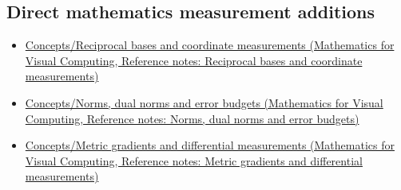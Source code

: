 \subsection{Direct mathematics measurement additions}\label{appendix-a6d556a4ef50-direct-mathematics-measurement-additions}

\hypertarget{appendix-a6d556a4ef50-direct-mathematics-measurement-additions}{}

\begin{itemize}
\tightlist
\item
  \href{../02-Mathematics-for-Visual-Computing/main.pdf\#nameddest=appendix-6b3d696dd902}{Concepts/Reciprocal bases and coordinate measurements (Mathematics for Visual Computing, Reference notes: Reciprocal bases and coordinate measurements)}
\item
  \href{../02-Mathematics-for-Visual-Computing/main.pdf\#nameddest=appendix-d6d9dbbe3c14}{Concepts/Norms, dual norms and error budgets (Mathematics for Visual Computing, Reference notes: Norms, dual norms and error budgets)}
\item
  \href{../02-Mathematics-for-Visual-Computing/main.pdf\#nameddest=appendix-f4acdb1d5563}{Concepts/Metric gradients and differential measurements (Mathematics for Visual Computing, Reference notes: Metric gradients and differential measurements)}
\end{itemize}
